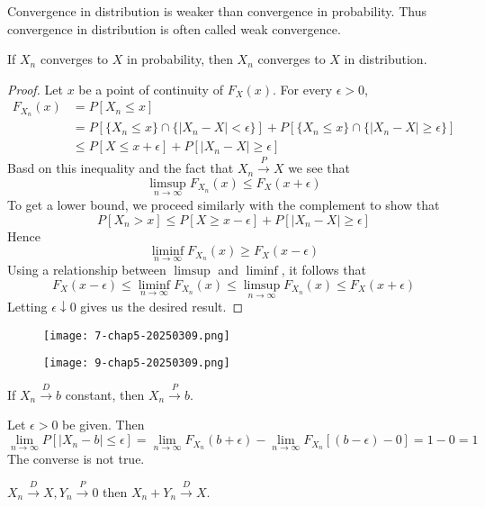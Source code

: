 Convergence in distribution is weaker than convergence in probability. Thus convergence in distribution is often called weak convergence.

\begin{theorem}
If $X_n$ converges to $X$ in probability, then $X_n$ converges to $X$ in distribution.\label{4b6469}
\end{theorem}\begin{proof}
Let $x$ be a point of continuity of $F_{X}(x)$. For every $\epsilon>0$,
\[
\begin{aligned}
F_{X_n}(x) & =P[X_n\leq x] \\
 & =P[\{ X_n\leq x \}\cap \{ \lvert X_n-X \rvert <\epsilon \}]+P[\{ X_n\leq x \}\cap \{ \lvert X_n-X \rvert \geq \epsilon \}] \\
 & \leq P[X\leq x+\epsilon]+P[\lvert X_n-X \rvert \geq \epsilon]
\end{aligned}
\]
Basd on this inequality and the fact that $X_n\overset{ P }{ \to }X$ we see that
\[
\limsup_{ n \to \infty } F_{X_n}(x)\leq F_{X}(x+\epsilon)
\]
To get a lower bound, we proceed similarly with the complement to show that
\[
P[X_n>x]\leq P[X\geq x-\epsilon]+P[\lvert X_n-X \rvert \geq \epsilon]
\]
Hence
\[
\liminf_{ n \to \infty } F_{X_n}(x)\geq F_{X}(x-\epsilon)
\]
Using a relationship between $\limsup$ and $\liminf$, it follows that
\[
F_{X}(x-\epsilon)\leq \liminf_{ n \to \infty } F_{X_n}(x)\leq \limsup_{ n \to \infty } F_{X_n}(x)\leq F_{X}(x+\epsilon)
\]
Letting $\epsilon \downarrow0$ gives us the desired result.
\end{proof}

\begin{figure}[H]
\centering
\texttt{[image: 7-chap5-20250309.png]}
\label{}
\end{figure}

\begin{figure}[H]
\centering
\texttt{[image: 9-chap5-20250309.png]}
\label{}
\end{figure}

\begin{theorem}
If $X_n\overset{ D }{ \to }b$ constant, then $X_n\overset{ P }{ \to }b$.
\end{theorem}
Let $\epsilon>0$ be given. Then
\[
\lim_{ n \to \infty } P[\lvert X_n-b \rvert \leq \epsilon]=\lim_{ n \to \infty } F_{X_n}(b+\epsilon)-\lim_{ n \to \infty } F_{X_n}[(b-\epsilon)-0]=1-0=1
\]
The converse is not true.

\begin{theorem}
$X_n\overset{ D }{ \to }X,Y_n\overset{ P }{ \to }0$ then $X_n+Y_n\overset{ D }{ \to }X$.\label{e41498}
\end{theorem}

